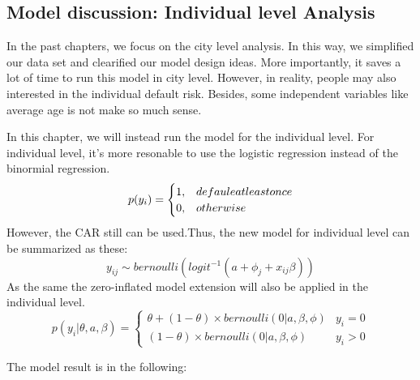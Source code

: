 \documentclass[]{tufte-handout}
\begin{document}
\hypertarget{model-discussion-individual-level-analysis}{%
\subsection{Model discussion: Individual level
Analysis}\label{model-discussion-individual-level-analysis}}

In the past chapters, we focus on the city level analysis. In this way,
we simplified our data set and clearified our model design ideas. More
importantly, it saves a lot of time to run this model in city level.
However, in reality, people may also interested in the individual
default risk. Besides, some independent variables like average age is
not make so much sense.

In this chapter, we will instead run the model for the individual level.
For individual level, it's more resonable to use the logistic regression
instead of the binormial regression. \[p(y_i) =\begin{cases} 
1, & defaule \space at \space least \space once \\
0, & otherwise \end{cases}\] However, the CAR still can be used.Thus,
the new model for individual level can be summarized as these:
\[ y_{ij} \sim bernoulli(logit^{-1}(a + \phi_j + x_{ij}\beta)) \] As the
same the zero-inflated model extension will also be applied in the
individual level. \[p(y_i | \theta,a,\beta) =\begin{cases}  
\theta + (1-\theta) \times bernoulli(0 |a,\beta,\phi ) & y_i =0 \\
(1-\theta) \times bernoulli(0 |a,\beta,\phi )  & y_i > 0 \end{cases}\]

The model result is in the following:
\end{document}

